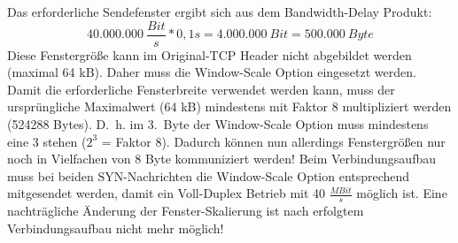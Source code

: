 Das erforderliche Sendefenster ergibt sich aus dem Bandwidth-Delay Produkt:
\[40.000.000 \ \frac{Bit}{s} * 0,1s = 4.000.000 \ Bit = 500.000 \ Byte\]
Diese Fenstergröße kann im Original-TCP Header nicht abgebildet werden (maximal 64 kB).
Daher muss die Window-Scale Option eingesetzt werden.
Damit die erforderliche Fensterbreite verwendet werden kann, muss der ursprüngliche Maximalwert (64 kB) mindestens mit Faktor 8 multipliziert werden (524288 Bytes).
D.\ h. im 3.\ Byte der Window-Scale Option muss mindestens eine 3 stehen ($2^3$ = Faktor 8).
Dadurch können nun allerdings Fenstergrößen nur noch in Vielfachen
von 8 Byte kommuniziert werden!
Beim Verbindungsaufbau muss bei beiden SYN-Nachrichten die Window-Scale Option entsprechend mitgesendet werden, damit ein Voll-Duplex Betrieb mit 40 $\frac{MBit}{s}$ möglich ist.
Eine nachträgliche Änderung der Fenster-Skalierung ist nach erfolgtem Verbindungsaufbau nicht mehr möglich!